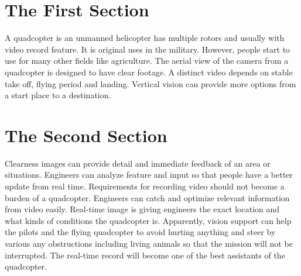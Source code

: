 \documentclass[onecolumn, draftclsnofoot,10pt, compsoc]{IEEEtran}
\begin{document}
\begin{titlepage}
\begin{singlespace}
\begin{abstract}
        	\end{abstract}
    \end{singlespace}
\end{titlepage}
\newpage
{}
\tableofcontents
\clearpage

\section{The First Section}
A quadcopter is an unmanned helicopter has multiple rotors and usually with video record feature. It is original uses in the military. However, people start to use for many other fields like agriculture. The aerial view of the camera from a quadcopter is designed to have clear footage. A distinct video depends on stable take off, flying period and landing. Vertical vision can provide more options from a start place to a destination.  
\section{The Second Section}
Clearness images can provide detail and immediate feedback of an area or situations. Engineers can analyze feature and input so that people have a better update from real time. Requirements for recording video should not become a burden of a quadcopter. Engineers can catch and optimize relevant information from video easily. Real-time image is giving engineers the exact location and what kinds of conditions the quadcopter is. Apparently, vision support can help the pilots and the flying quadcopter to avoid hurting anything and steer by various any obstructions including living animals so that the mission will not be interrupted. The real-time record will become one of the best assistants of the quadcopter. 
\end{document}
